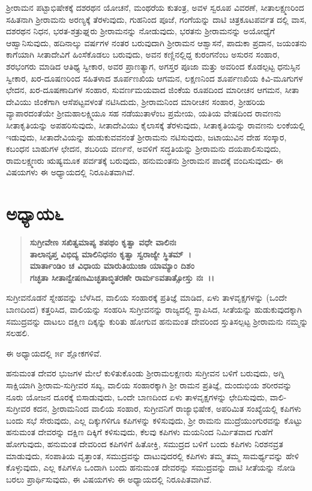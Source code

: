 ಶ‍್ರೀರಾಮನ ಪಟ್ಟಾಭಿಷೇಕಕ್ಕೆ ದಶರಥನ ಯೋಚನೆ, ಮಂಥರೆಯ ಕುತಂತ್ರ, ಅವಳ ಸ್ವರೂಪ ವಿವರಣೆ, ಸೀತಾಲಕ್ಷ್ಮಣರಿಂದ ಸಹಿತನಾಗಿ ಶ‍್ರೀರಾಮನು ಅರಣ್ಯಕ್ಕೆ ತೆರಳುವುದು, ಗುಹನಿಂದ ಪೂಜೆ, ಗಂಗೆಯನ್ನು ದಾಟಿ ಚಿತ್ರಕೂಟಪರ್ವತ ದಲ್ಲಿ ವಾಸ, ದಶರಥನ ನಿಧನ, ಭರತ-ಶತ್ರುಘ್ನರು ಶ‍್ರೀರಾಮನನ್ನು ನೋಡುವುದು, ಭರತನು ಶ‍್ರೀರಾಮನನ್ನು ಅಯೋಧ್ಯೆಗೆ ಆಹ್ವಾನಿಸುವುದು, ಹದಿನಾಲ್ಕು ವರ್ಷಗಳ ನಂತರ ಬರುವುದಾಗಿ ಶ‍್ರೀರಾಮನ ಆಶ್ವಾಸನೆ, ಪಾದುಕಾ ಪ್ರದಾನ, ಜಯಂತನು ಕಾಗೆಯಾಗಿ ಸೀತಾದೇವಿಗೆ ಹಿಂಸೆಕೊಡಲು ಬರುವುದು, ಅವನ ಕಣ್ಣಿನಲ್ಲಿದ್ದ ಕುರಂಗನೆಂಬ ಅಸುರನ ಸಂಹಾರ, ಶರಭಂಗರು ಮಾಡಿದ ಆತಿಥ್ಯ ಸ್ವೀಕಾರ, ಅವರ ಪ್ರಾಣತ್ಯಾಗ, ಅಗಸ್ತರ ಪೂಜಾ ಮತ್ತು ಅವರಿಂದ ಕೊಡಲ್ಪಟ್ಟ ಧನುಸ್ಸಿನ ಸ್ವೀಕಾರ, ಖರ-ದೂಷಣರಿಂದ ಸಹಿತಳಾದ ಶೂರ್ಪಣಖಿಯ ಆಗಮನ, ಲಕ್ಷಣನಿಂದ ಶೂರ್ಪಣಖಿಯ ಕಿವಿ-ಮೂಗುಗಳ ಛೇದನ, ಖರ-ದೂಷಣಾದಿಗಳ ಸಂಹಾರ, ಸುವರ್ಣಮಯವಾದ ಜಿಂಕೆಯ ರೂಪದಿಂದ ಮಾರೀಚನ ಆಗಮನ, ಸೀತಾ ದೇವಿಯು ಜಿಂಕೆಗಾಗಿ ಆಸೆಪಟ್ಟವಳಂತೆ ನಟಿಸಿದುದು, ಶ‍್ರೀರಾಮನಿಂದ ಮಾರೀಚನ ಸಂಹಾರ, ಶ‍್ರೀಹರಿಯ ವ್ಯಾಪಾರದಂತೆಯೇ ಶ‍್ರೀಮಹಾಲಕ್ಷ್ಮಿಯೂ ಸಹ ನಡೆಯುತಾಳೆಂಬ ಪ್ರಮೇಯ, ಯತಿಯ ವೇಷದಿಂದ ರಾವಣನು ಸೀತಾಕೃತಿಯನ್ನು ಅಪಹರಿಸುವುದು, ಸೀತಾದೇವಿಯು ಕೈಲಾಸಕ್ಕೆ ತೆರಳುವುದು, ಸೀತಾಕೃತಿಯನ್ನು ರಾವಣನು ಲಂಕೆಯಲ್ಲಿ ಇಡುವುದು, ಸೀತಾದೇವಿಯನ್ನು ಹುಡುಕುವವನಂತೆ ಶ‍್ರೀರಾಮನು ನಟಿಸುವುದು, ಜಟಾಯುವಿನ ದೇಹ ಸಂಸ್ಕಾರ, ಕಬಂಧನ ಬಾಹುಗಳ ಛೇದನ, ಶಬರಿಯ ವರ್ಣನೆ, ಅವಳಿಗೆ ಸದ್ಧತಿಯನ್ನು ಶ‍್ರೀರಾಮನು ದಯಪಾಲಿಸುವುದು, ರಾಮಲಕ್ಷ್ಮಣರು ಋಷ್ಯಮೂಕ ಪರ್ವತಕ್ಕೆ ಬರುವುದು, ಹನುಮಂತನು ಶ‍್ರೀರಾಮನ ಪಾದಕ್ಕೆ ವಂದಿಸುವುದು- ಈ ವಿಷಯಗಳು ಈ ಅಧ್ಯಾಯದಲ್ಲಿ ನಿರೂಪಿತವಾಗಿವೆ.


\section*{ಅಧ್ಯಾಯ\enginline{-}೬}

\begin{verse}
\textbf{ಸುಗ್ರೀವೇಣ ಸಖಿತ್ವಮಾಪ್ಯ ಶಪಥಂ ಕೃತ್ವಾ ವಧೇ ವಾಲಿನಃ}\\\textbf{ತಾಲಾನೃಪ್ತ ವಿಭಿದ್ಯ ಮಾಲಿನಿಧನಂ ಕೃತ್ವಾ ಸ್ವರಾಜ್ಯೇ ಸ್ಥಿತಮ್~।}\\\textbf{ಮಾರ್ತಾಂಡಿಂ ಚ ವಿಧಾಯ ಮಾರುತಿಯುಜಾ ಯಾಮ್ಯಾಂ ದಿಶಂ}\\\textbf{ಗಚ್ಛತಾ ಸೀತಾನ್ವೇಷಣಮಿಚ್ಛತಾಬ್ಧಿತರಣೇ ರಾರ್ಮಽವತಾತ್ಸೋಸ್ತು ನಃ~।।}
\end{verse}

ಸುಗ್ರೀವನೊಡನೆ ಸ್ನೇಹವನ್ನು ಬೆಳೆಸಿದ, ವಾಲಿಯ ಸಂಹಾರಕ್ಕೆ ಪ್ರತಿಜ್ಞೆ ಮಾಡಿದ, ಏಳು ತಾಳವೃಕ್ಷಗಳನ್ನು (ಒಂದೇ ಬಾಣದಿಂದ) ಕತ್ತರಿಸಿದ, ವಾಲಿಯನ್ನು ಸಂಹರಿಸಿ ಸುಗ್ರೀವನನ್ನು ರಾಜ್ಯದಲ್ಲಿ ಸ್ಥಾಪಿಸಿದ, ಸೀತೆಯನ್ನು ಹುಡುಕುವುದಕ್ಕಾಗಿ ಸಮುದ್ರವನ್ನು ದಾಟಲು ದಕ್ಷಿಣ ದಿಕ್ಕನ್ನು ಕುರಿತು ಹೋಗುವ ಹನುಮಂತ ದೇವರಿಂದ ಸ್ತುತಿಸಲ್ಪಟ್ಟ ಶ‍್ರೀರಾಮನು ನಮ್ಮನ್ನು ಸಲಹಲಿ.

ಈ ಅಧ್ಯಾಯದಲ್ಲಿ ೫೯ ಶ್ಲೋಕಗಳಿವೆ.

ಹನುಮಂತ ದೇವರ ಭುಜಗಳ ಮೇಲೆ ಕುಳಿತುಕೊಂಡು ಶ‍್ರೀರಾಮಲಕ್ಷಣರು ಸುಗ್ರೀವನ ಬಳಿಗೆ ಬರುವುದು, ಅಗ್ನಿ ಸಾಕ್ಷಿಯಾಗಿ ಶ‍್ರೀರಾಮ-ಸುಗ್ರೀವರ ಸಖ್ಯ, ವಾಲಿಯ ಸಂಹಾರಕ್ಕಾಗಿ ಶ‍್ರೀ ರಾಮನ ಪ್ರತಿಜ್ಞೆ, ದುಂದುಭಿಯ ಶರೀರವನ್ನು ನೂರು ಯೋಜನ ದೂರಕ್ಕೆ ಬಿಸಾಡುವುದು, ಒಂದೇ ಬಾಣದಿಂದ ಏಳು ತಾಳವೃಕ್ಷಗಳನ್ನು ಛೇದಿಸುವುದು, ವಾಲಿ-ಸುಗ್ರೀವರ ಕದನ, ಶ‍್ರೀರಾಮನಿಂದ ವಾಲಿಯ ಸಂಹಾರ, ಸುಗ್ರೀವನಿಗೆ ರಾಜ್ಯಾಭಿಷೇಕ, ಅಪರಿಮಿತ ಸಂಖ್ಯೆಯಲ್ಲಿ ಕಪಿಗಳು ಬಂದು ಸಭೆ ಸೇರುವುದು, ಎಲ್ಲ ದಿಕ್ಕುಗಳಿಗೂ ಕಪಿಗಳನ್ನು ಕಳಿಸುವುದು, ಶ‍್ರೀ ರಾಮನು ಮುದ್ರೆಯುಂಗುರವನ್ನು ಕೊಟ್ಟು ಹನುಮಂತ ದೇವರನ್ನು ದಕ್ಷಿಣ ದಿಕ್ಕಿಗೆ ಕಳಿಸುವುದು, ಕೆಲವು ಕಪಿಗಳು ಮಯನಿಂದ ನಿರ್ಮಿತವಾದ ಗುಹೆಗೆ ಹೋಗುವುದು, ಹನುಮಂತ ದೇವರಿಂದ ಕಪಿಗಳಿಗೆ ಹಿತೋಕ್ತಿ, ಸಮುದ್ರದ ಬಳಿಗೆ ಬಂದು ಕಪಿಗಳು ನಿರಶನವ್ರತ ಮಾಡುವುದು, ಸಂಪಾತಿಯ ವೃತ್ತಾಂತ, ಸಮುದ್ರವನ್ನು ದಾಟುವುದರಲ್ಲಿ ಕಪಿಗಳು ತಮ್ಮ ತಮ್ಮ ಸಾಮರ್ಥ್ಯವನ್ನು ಹೇಳಿ ಕೊಳ್ಳುವುದು, ಎಲ್ಲ ಕಪಿಗಳೂ ಒಂದಾಗಿ ಬಂದು ಹನುಮಂತ ದೇವರನ್ನು ಸಮುದ್ರವನ್ನು ದಾಟಿ ಸೀತೆಯನ್ನು ನೋಡಿ ಬರಲು ಪ್ರಾರ್ಥಿಸುವುದು, ಈ ವಿಷಯಗಳು ಈ ಅಧ್ಯಾಯದಲ್ಲಿ ನಿರೂಪಿತವಾಗಿವೆ.



